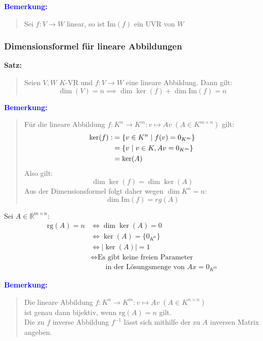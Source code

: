 \documentclass{article}
\newcommand{\smsp}{\phantom{\hspace{3px}}}
\newcommand{\blue}[1]{\textcolor{blue}{#1}}
\newcommand{\dgr}[1]{\textcolor{dgr}{#1}}
\newcommand{\an}[1]{\blue{\textbf{Bemerkung: }}\begin{quote}#1\end{quote}}
\newcommand{\se}[1]{\dgr{\textbf{Satz: }}\begin{quote}#1\end{quote}}
\newcommand{\R}{\mathbb{R}}
\renewcommand{\st}{\smsp | \smsp}
\newcommand{\rg}{\text{rg}}
\newcommand{\im}{\text{Im}}
\begin{document}
\an{
    Sei $f: V \to W$ linear, so ist $\im(f)$ ein UVR von $W$
}

\subsubsection{Dimensionsformel für lineare Abbildungen}

\se{
    Seien $V,W$ $K$-VR und $f: V \to W$ eine lineare Abbildung.
    Dann gilt:
    \[
        \dim(V) = n \implies \dim\ker(f) + \dim\im(f) = n
    \]
}

\an{
    Für die lineare Abbildung $f: K^n \to K^m: v \mapsto Av \; (A \in K^{m \times n})$ gilt:
    \begin{align*}
        \ker(f) :&= \{v \in K^n \st f(v) = 0_{K^m}\}\\
        &= \{v \st v \in K, Av = 0_{K^m}\}\\
        &= \ker(A)
    \end{align*}
    Also gilt:
    \[
        \dim \ker(f) = \dim \ker(A)
    \]
    Aus der Dimensionsformel folgt daher wegen $\dim K^n = n$:
    \[
        \dim \im(f) = rg(A)
    \]
}

Sei $A \in \R^{m \times n}$:
\begin{align*}
    \rg(A) = n &\iff \dim \ker(A) = 0\\
    &\iff \ker(A) = \{0_{K^n}\}\\
    &\iff |\ker(A)| = 1\\
    &\iff \text{Es gibt keine freien Parameter}\\
    &\phantom{\iff \;\;} \text{in der Lösungsmenge von } Ax = 0_{K^m}
\end{align*}

\newpage
\an{
    Die lineare Abbildung $f: K^n \to K^m: v \mapsto Av \; (A \in K^{n \times n})$\\
    ist genau dann bijektiv, wenn $\rg(A) = n$ gilt.\\
    Die zu $f$ inverse Abbildung $f^{-1}$ lässt sich mithilfe der zu $A$ inversen Matrix angeben.
}
\end{document}
